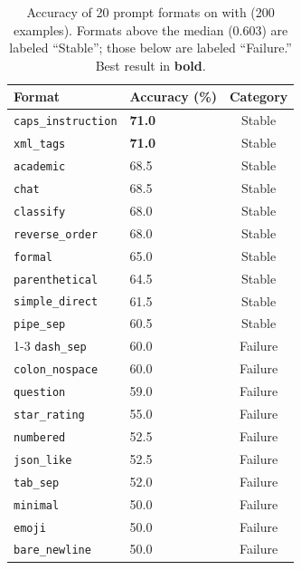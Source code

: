 \begin{table}[t]
    \centering
    \caption{Accuracy of 20 prompt formats on \ssttwo with \gptsmall (200 examples). Formats above the median (0.603) are labeled ``Stable''; those below are labeled ``Failure.'' Best result in \textbf{bold}.}
    \label{tab:formats}
    \begin{tabular}{@{}llc@{}}
        \toprule
        \textbf{Format} & \textbf{Accuracy (\%)} & \textbf{Category} \\
        \midrule
        \texttt{caps\_instruction} & \textbf{71.0} & Stable \\
        \texttt{xml\_tags}         & \textbf{71.0} & Stable \\
        \texttt{academic}          & 68.5 & Stable \\
        \texttt{chat}              & 68.5 & Stable \\
        \texttt{classify}          & 68.0 & Stable \\
        \texttt{reverse\_order}    & 68.0 & Stable \\
        \texttt{formal}            & 65.0 & Stable \\
        \texttt{parenthetical}     & 64.5 & Stable \\
        \texttt{simple\_direct}    & 61.5 & Stable \\
        \texttt{pipe\_sep}         & 60.5 & Stable \\
        \cmidrule(lr){1-3}
        \texttt{dash\_sep}         & 60.0 & Failure \\
        \texttt{colon\_nospace}    & 60.0 & Failure \\
        \texttt{question}          & 59.0 & Failure \\
        \texttt{star\_rating}      & 55.0 & Failure \\
        \texttt{numbered}          & 52.5 & Failure \\
        \texttt{json\_like}        & 52.5 & Failure \\
        \texttt{tab\_sep}          & 52.0 & Failure \\
        \texttt{minimal}           & 50.0 & Failure \\
        \texttt{emoji}             & 50.0 & Failure \\
        \texttt{bare\_newline}     & 50.0 & Failure \\
        \bottomrule
    \end{tabular}
\end{table}

